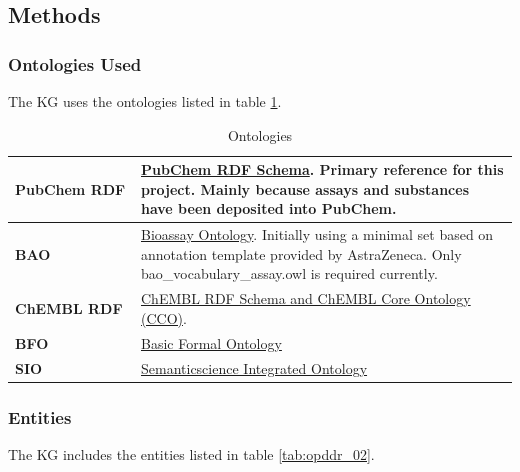 \subsection{Methods}

\subsubsection{Ontologies Used}

The KG uses the ontologies listed in table \ref{tab:opddr_01}.

\begin{table}
\caption{Ontologies}
\label{tab:opddr_01}
\centering
\begin{tabular}{p{0.25\linewidth}p{0.75\linewidth}}
\hline
\textbf{PubChem RDF} & \href{http://rdf.ncbi.nlm.nih.gov/pubchem/}{PubChem RDF Schema}. Primary reference for this project.  Mainly because assays and substances have been deposited into PubChem.\\
\hline
\textbf{BAO} & \href{http://www.bioassayontology.org/bao\#}{Bioassay Ontology}.  Initially using a minimal set based on annotation template provided by AstraZeneca.  Only bao\_vocabulary\_assay.owl is required currently.\\
\hline
\textbf{ChEMBL RDF} & \href{http://rdf.ebi.ac.uk/terms/chembl\#}{ChEMBL RDF Schema and ChEMBL Core Ontology (CCO)}. 
\\
\hline
\textbf{BFO} &  \href{http://purl.obolibrary.org/obo/}{Basic Formal Ontology}\\
\hline
\textbf{SIO} & \href{http://semanticscience.org/resource/}{Semanticscience Integrated Ontology}\\
\hline
\end{tabular}
\end{table}

\subsubsection{Entities}

The KG includes the entities listed in table \ref{tab:opddr_02}.

